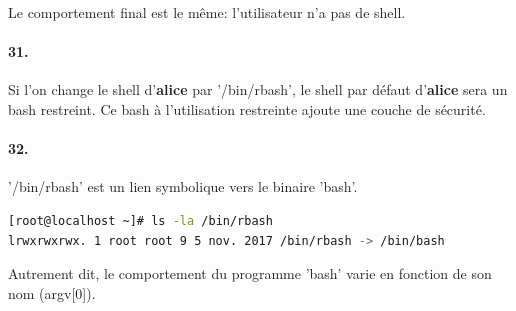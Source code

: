 \documentclass[10pt]{article}
\begin{document}
Le comportement final est le même: l'utilisateur n'a pas de shell.


    \paragraph{31.}
    Si l'on change le shell d'\textbf{alice} par '/bin/rbash', le shell par défaut d'\textbf{alice} sera un bash restreint.
    Ce bash à l'utilisation restreinte ajoute une couche de sécurité.
    
    
    \paragraph{32.}
    '/bin/rbash' est un lien symbolique vers le binaire 'bash'.
        
\begin{lstlisting}[language=bash]
[root@localhost ~]# ls -la /bin/rbash
lrwxrwxrwx. 1 root root 9 5 nov. 2017 /bin/rbash -> /bin/bash
\end{lstlisting}
        
    Autrement dit, le comportement du programme 'bash' varie en fonction de son nom (argv[0]).
    
\end{document}

